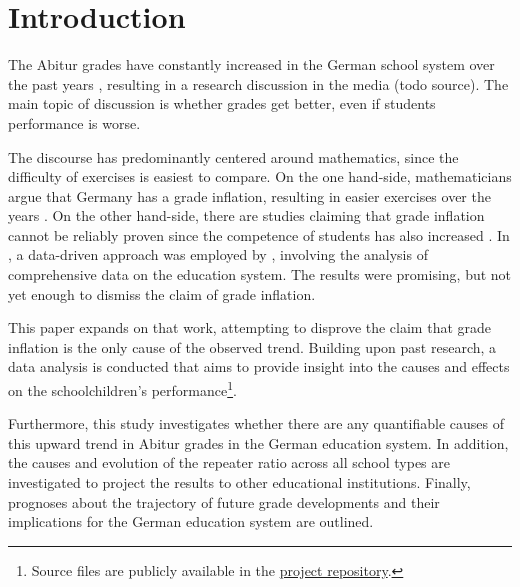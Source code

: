 \section{Introduction} \label{sec:Introduction}
The Abitur grades have constantly increased in the German school system over the past years \cite{kultusminister_konferenz_abiturnoten_nodate}, resulting in a research discussion in the media (todo source). The main topic of discussion is whether grades get better, even if students performance is worse.

The discourse has predominantly centered around mathematics, since the difficulty of exercises is easiest to compare. On the one hand-side, mathematicians argue that Germany has a grade inflation, resulting in easier exercises over the years \cite{kuhnel_modellierungskompetenz_2015, jahnke_hamburger_2014,lemmermeyer_zentralabitur_nodate}. On the other hand-side, there are studies claiming that grade inflation cannot be reliably proven since the competence of students has also increased \cite{schleithoff_noteninflation_2015}. In \citeyear{grozinger_gibt_2015}, a data-driven approach was employed by \citeauthor{grozinger_gibt_2015}, involving the analysis of comprehensive data on the education system. The results were promising, but not yet enough to dismiss the claim of grade inflation.

This paper expands on that work, attempting to disprove the claim that grade inflation is the only cause of the observed trend. Building upon past research, a data analysis is conducted that aims to provide insight into the causes and effects on the schoolchildren's performance\footnote{Source files are publicly available in the \href{https://github.com/KarylReyne/DataLiteracyWS23}{project repository}.}.

Furthermore, this study investigates whether there are any quantifiable causes of this upward trend in Abitur grades in the German education system. In addition, the causes and evolution of the repeater ratio across all school types are investigated to project the results to other educational institutions. Finally, prognoses about the trajectory of future grade developments and their implications for the German education system are outlined.